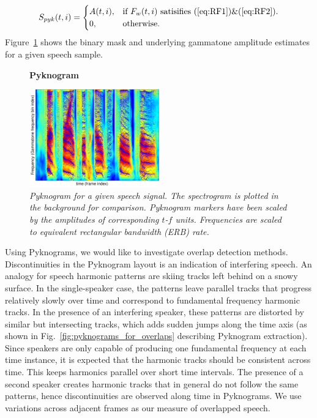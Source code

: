 {\begin{equation}
S_{pyk}(t,i)=\begin{cases}
A(t,i), & \text{if $F_w(t,i)$ satisifies (\ref{eq:RF1})\&(\ref{eq:RF2})}.\\
0, & \text{otherwise}.
\end{cases}
\end{equation}
Figure~\ref{fig:pyknograms} shows the binary mask and underlying gammatone amplitude estimates for a given speech sample. 

\begin{figure}[h!]
	\centering
	\vspace{4mm}
	\textbf{Pyknogram}\par\medskip
	\includegraphics[height =2.in, width=0.5\textwidth]{figures/pyknogram_vs_spectrogram}
	\vspace{-1mm}
	\caption{\it Pyknogram for a given speech signal. The spectrogram is plotted in the background for comparison. Pyknogram markers have been scaled by the amplitudes of corresponding $t$-$f$ units. Frequencies are scaled to equivalent rectangular bandwidth (ERB) rate.}
	\vspace{-1mm}
	\label{fig:pyknograms}
\end{figure}

Using Pyknograms, we would like to investigate overlap detection methods.
Discontinuities in the Pyknogram layout is an indication of interfering speech. 
An analogy for speech harmonic patterns are skiing tracks left behind on a snowy surface. 
In the single-speaker case, the patterns leave parallel tracks that progress relatively slowly over time and correspond to fundamental frequency harmonic tracks. 
In the presence of an interfering speaker, these patterns are distorted by similar but intersecting tracks, which adds sudden jumps along the time axis (as shown in Fig.~\ref{fig:pyknograms_for_overlaps} describing Pyknogram extraction). 
Since speakers are only capable of producing one fundamental frequency at each time instance, it is expected that the harmonic tracks should be consistent across time. 
This keeps harmonics parallel over short time intervals.   
The presence of a second speaker creates harmonic tracks that in general do not follow the same patterns, hence discontinuities are observed along time in Pyknograms. We use variations across adjacent frames as our measure of overlapped speech.

}
